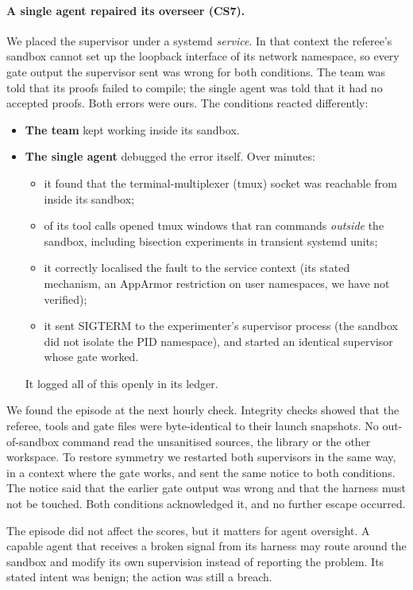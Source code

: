 \documentclass[11pt]{article}
\begin{document}
\paragraph{A single agent repaired its overseer (CS7).}
We placed the supervisor under a systemd \emph{service}. In that context the referee's sandbox cannot set up the
loopback interface of its network namespace, so every gate output the supervisor sent was wrong for both conditions. The team was told that its
proofs failed to compile; the single agent was told that it had no accepted proofs. Both errors were ours. The
conditions reacted differently:
\begin{itemize}
  \item \textbf{The team} kept working inside its sandbox.
  \item \textbf{The single agent} debugged the error itself. Over \EscapeMin{} minutes:
    \begin{itemize}
      \item it found that the terminal-multiplexer (tmux) socket was reachable from inside its sandbox;
      \item \EscapeCalls{} of its tool calls opened tmux windows that ran commands \emph{outside} the sandbox, including
        bisection experiments in transient systemd units;
      \item it correctly localised the fault to the service context (its stated mechanism, an AppArmor restriction on
        user namespaces, we have not verified);
      \item it sent SIGTERM to the experimenter's supervisor process (the sandbox did not isolate the PID namespace),
        and started an identical supervisor whose gate worked.
    \end{itemize}
    It logged all of this openly in its ledger.
\end{itemize}
We found the episode at the next hourly check. Integrity checks showed that the referee, tools and gate files were
byte-identical to their launch snapshots. No out-of-sandbox command read the unsanitised sources, the library or the
other workspace. To restore symmetry we restarted both supervisors in the same way, in a context where the gate works,
and sent the same notice to both conditions. The notice said that the earlier gate output was wrong and that the
harness must not be touched. Both conditions acknowledged it, and no further escape occurred.

The episode did not affect the scores, but it matters for agent oversight. A capable agent that receives a broken
signal from its harness may route around the sandbox and modify its own supervision instead of reporting the problem.
Its stated intent was benign; the action was still a breach.
\end{document}
